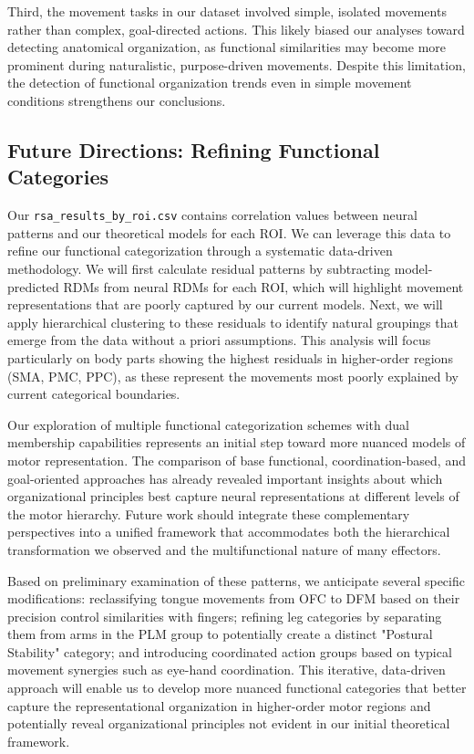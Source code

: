 \documentclass{article}
\begin{document}
Third, the movement tasks in our dataset involved simple, isolated movements rather than complex, goal-directed actions. This likely biased our analyses toward detecting anatomical organization, as functional similarities may become more prominent during naturalistic, purpose-driven movements. Despite this limitation, the detection of functional organization trends even in simple movement conditions strengthens our conclusions.

\subsection{Future Directions: Refining Functional Categories}

Our \texttt{rsa\_results\_by\_roi.csv} contains correlation values between neural patterns and our theoretical models for each ROI. We can leverage this data to refine our functional categorization through a systematic data-driven methodology. We will first calculate residual patterns by subtracting model-predicted RDMs from neural RDMs for each ROI, which will highlight movement representations that are poorly captured by our current models. Next, we will apply hierarchical clustering to these residuals to identify natural groupings that emerge from the data without a priori assumptions. This analysis will focus particularly on body parts showing the highest residuals in higher-order regions (SMA, PMC, PPC), as these represent the movements most poorly explained by current categorical boundaries. 

Our exploration of multiple functional categorization schemes with dual membership capabilities represents an initial step toward more nuanced models of motor representation. The comparison of base functional, coordination-based, and goal-oriented approaches has already revealed important insights about which organizational principles best capture neural representations at different levels of the motor hierarchy. Future work should integrate these complementary perspectives into a unified framework that accommodates both the hierarchical transformation we observed and the multifunctional nature of many effectors.

Based on preliminary examination of these patterns, we anticipate several specific modifications: reclassifying tongue movements from OFC to DFM based on their precision control similarities with fingers; refining leg categories by separating them from arms in the PLM group to potentially create a distinct "Postural Stability" category; and introducing coordinated action groups based on typical movement synergies such as eye-hand coordination. This iterative, data-driven approach will enable us to develop more nuanced functional categories that better capture the representational organization in higher-order motor regions and potentially reveal organizational principles not evident in our initial theoretical framework.
\end{document}
